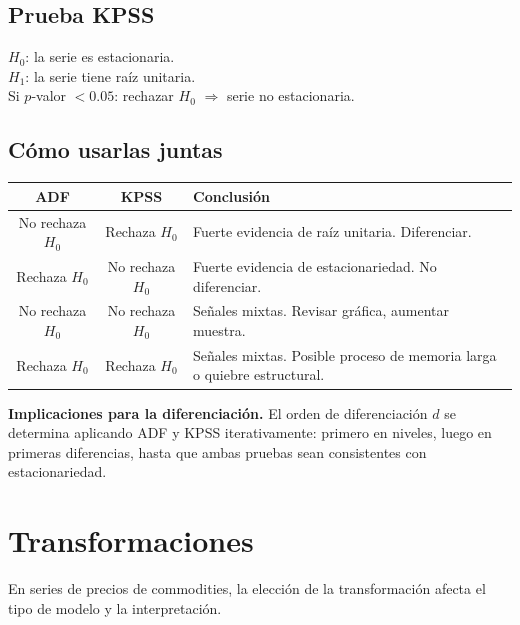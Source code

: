 \documentclass[12pt,a4paper]{article}
\theoremstyle{definition}
\begin{document}
\subsection{Prueba KPSS}

\begin{defbox}[KPSS]
$H_0$: la serie es estacionaria.\\
$H_1$: la serie tiene raíz unitaria.\\
Si $p$-valor $< 0.05$: rechazar $H_0$ $\Rightarrow$ serie no estacionaria.
\end{defbox}

\subsection{Cómo usarlas juntas}

\begin{center}
\renewcommand{\arraystretch}{1.3}
\begin{tabular}{ccp{6.5cm}}
\toprule
\textbf{ADF} & \textbf{KPSS} & \textbf{Conclusión} \\
\midrule
No rechaza $H_0$ & Rechaza $H_0$ & Fuerte evidencia de raíz unitaria. Diferenciar. \\
Rechaza $H_0$ & No rechaza $H_0$ & Fuerte evidencia de estacionariedad. No diferenciar. \\
No rechaza $H_0$ & No rechaza $H_0$ & Señales mixtas. Revisar gráfica, aumentar muestra. \\
Rechaza $H_0$ & Rechaza $H_0$ & Señales mixtas. Posible proceso de memoria larga o quiebre estructural. \\
\bottomrule
\end{tabular}
\end{center}

\noindent\textbf{Implicaciones para la diferenciación.} El orden de diferenciación
$d$ se determina aplicando ADF y KPSS iterativamente: primero en niveles, luego
en primeras diferencias, hasta que ambas pruebas sean consistentes con
estacionariedad.

\section{Transformaciones}

En series de precios de commodities, la elección de la transformación afecta
el tipo de modelo y la interpretación.
\end{document}
